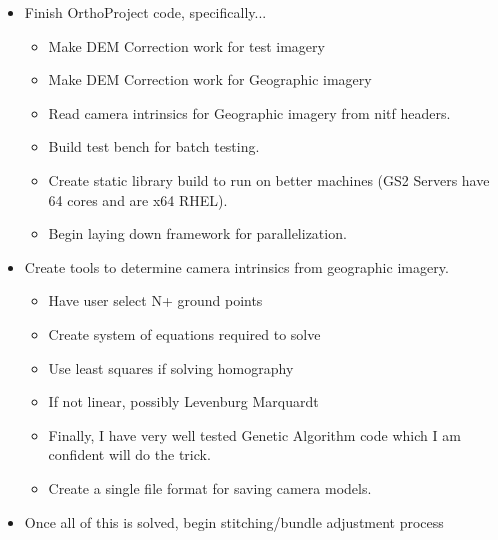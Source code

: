 \documentclass[12pt]{report}
\begin{document}
\begin{itemize}
\item Finish OrthoProject code, specifically...
    \begin{itemize}
    \item Make DEM Correction work for test imagery 
    \item Make DEM Correction work for Geographic imagery
    \item Read camera intrinsics for Geographic imagery from nitf headers.
    \item Build test bench for batch testing.
    \item Create static library build to run on better machines (GS2 Servers have 64 cores and are x64 RHEL).
    \item Begin laying down framework for parallelization.
    \end{itemize}
\item Create tools to determine camera intrinsics from geographic imagery.
    \begin{itemize}
    \item Have user select N+ ground points
    \item Create system of equations required to solve
    \item Use least squares if solving homography
    \item If not linear, possibly Levenburg Marquardt
    \item Finally, I have very well tested Genetic Algorithm code which I am confident will do the trick.
    \item Create a single file format for saving camera models.  
    \end{itemize}
\item Once all of this is solved, begin stitching/bundle adjustment process
\end{itemize}
\end{document}
